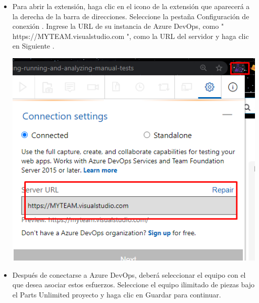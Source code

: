 \begin{itemize}
\item Para abrir la extensión, haga clic en el icono de la extensión que aparecerá a la derecha de la barra de direcciones. Seleccione la pestaña Configuración de conexión . Ingrese la URL de su instancia de Azure DevOps, como " https://MYTEAM.visualstudio.com ", como la URL del servidor y haga clic en Siguiente .
\begin{center}
\includegraphics[width=\columnwidth]{images/22}\newline
\end{center} 
\item Después de conectarse a Azure DevOps, deberá seleccionar el equipo con el que desea asociar estos esfuerzos. Seleccione el equipo ilimitado de piezas bajo el Parts Unlimited proyecto y haga clic en Guardar para continuar.
\begin{center}

\end{center}
\end{itemize}
